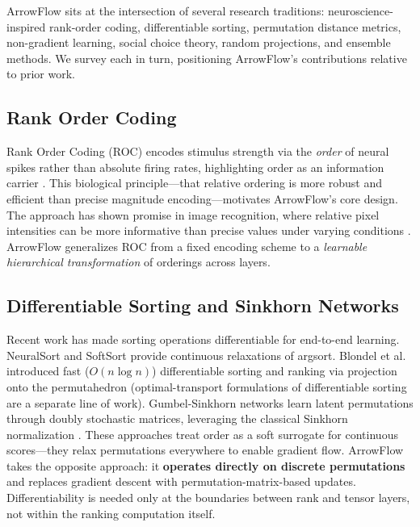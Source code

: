 \documentclass[12pt]{article}
\begin{document}
ArrowFlow sits at the intersection of several research traditions: neuroscience-inspired rank-order coding, differentiable sorting, permutation distance metrics, non-gradient learning, social choice theory, random projections, and ensemble methods. We survey each in turn, positioning ArrowFlow's contributions relative to prior work.

\subsection{Rank Order Coding}
Rank Order Coding (ROC) encodes stimulus strength via the \emph{order} of neural spikes rather than absolute firing rates, highlighting order as an information carrier \citep{thorpe1998rapid, gautrais1998rate}. This biological principle---that relative ordering is more robust and efficient than precise magnitude encoding---motivates ArrowFlow's core design. The approach has shown promise in image recognition, where relative pixel intensities can be more informative than precise values under varying conditions \citep{jost2002rank, bonilla2022analyzing}. ArrowFlow generalizes ROC from a fixed encoding scheme to a \emph{learnable hierarchical transformation} of orderings across layers.

\subsection{Differentiable Sorting and Sinkhorn Networks}
Recent work has made sorting operations differentiable for end-to-end learning. NeuralSort \citep{grover2019neuralsort} and SoftSort \citep{prillo2020softsort} provide continuous relaxations of argsort. Blondel et al.\ \citep{blondel2020fast} introduced fast ($O(n\log n)$) differentiable sorting and ranking via projection onto the permutahedron (optimal-transport formulations of differentiable sorting are a separate line of work). Gumbel-Sinkhorn networks \citep{mena2018gumbelsinkhorn} learn latent permutations through doubly stochastic matrices, leveraging the classical Sinkhorn normalization \citep{sinkhorn1967diagonal}. These approaches treat order as a soft surrogate for continuous scores---they relax permutations everywhere to enable gradient flow. ArrowFlow takes the opposite approach: it \textbf{operates directly on discrete permutations} and replaces gradient descent with permutation-matrix-based updates. Differentiability is needed only at the boundaries between rank and tensor layers, not within the ranking computation itself.
\end{document}
